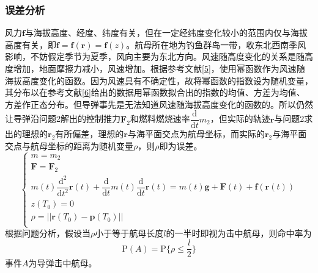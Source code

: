 \documentclass[UTF8]{article}
\begin{document}
\subsubsection{误差分析}
风力\(\textbf{f}\)与海拔高度、经度、纬度有关，但在一定经纬度变化较小的范围内仅与海拔高度有关，即\(\textbf{f}=\textbf{f}(\textbf{r})=\textbf{f}(z)\)。航母所在地为钓鱼群岛一带，收东北西南季风影响，不妨假定季节为夏季，风向主要为东北方向。风速随高度变化的关系是随高度增加，地面摩擦力减小，风速增加。根据参考文献\ref{5}，使用幂函数作为风速随海拔高度变化的函数。因为风速具有不确定性，故将幂函数的指数设为随机变量，其分布以在参考文献\ref{6}给出的数据用幂函数拟合出的指数的均值、方差为均值、方差作正态分布。但导弹事先是无法知道风速随海拔高度变化的函数的。所以仍然让导弹沿问题2解出的控制推力\(\textbf{F}_2\)和燃料燃烧速率\(\dfrac{\textrm{d}}{\textrm{d}t}m_2\)，但实际的轨迹\(\textbf{r}\)与问题2求出的理想的\(\textbf{r}_2\)有所偏差，理想的\(\textbf{r}\)与海平面交点为航母坐标，而实际的\(\textbf{r}_2\)与海平面交点与航母坐标的距离为随机变量\(\rho\)，则\(\rho\)即为误差。
\[\left\{
\begin{array}{l}
m=m_2\\
\textbf{F}=\textbf{F}_2\\
m(t)\dfrac{\textrm{d}^2}{\textrm{d}t^2}\textbf{r}(t)+\dfrac{\textrm{d}}{\textrm{d}t}m(t)\dfrac{\textrm{d}}{\textrm{d}t}\textbf{r}(t)=m(t)\textbf{g}+\textbf{F}(t)+\textbf{f}(\textbf{r}(t))\\
z(T_0)=0\\
\rho=||\textbf{r}(T_0)-\textbf{p}(T_0)||\\
\end{array}\right. \]
\indent 根据问题分析，假设当\(\rho\)小于等于航母长度\(l\)的一半时即视为击中航母，则命中率为
\[\textrm{P}(A)=\textrm{P}\{\rho\leqslant\dfrac{l}{2}\}\]
\indent 事件\(A\)为导弹击中航母。
\end{document}
